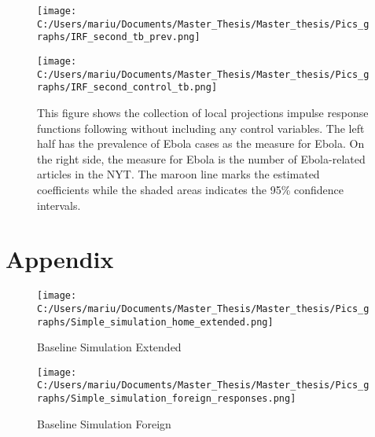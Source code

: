\documentclass{article}
\begin{document}
\begin{figure}[!ht] 
\begin{minipage}[t]{0.5\linewidth}\vspace{0pt} 
\texttt{[image: C:/Users/mariu/Documents/Master\_Thesis/Master\_thesis/Pics\_graphs/IRF\_second\_tb\_prev.png]}\\
\end{minipage}\hfill%
\begin{minipage}[t]{0.5\linewidth}\vspace{0pt} 
\texttt{[image: C:/Users/mariu/Documents/Master\_Thesis/Master\_thesis/Pics\_graphs/IRF\_second\_control\_tb.png]}\\
\end{minipage}\hfill%
\caption{This figure shows the collection of local projections impulse response functions following \cite{jorda2005estimation} without including any control variables. The left half has the prevalence of Ebola cases as the measure for Ebola. On the right side, the measure for Ebola is the number of Ebola-related articles in the NYT. The maroon line marks the estimated coefficients while the shaded areas indicates the 95\% confidence intervals.}
\label{IRF - Trade Balance}
\end{figure}




\pagebreak




\pagebreak
\section{Appendix}

\begin{figure}[!ht]
\begin{center}\caption{Baseline Simulation Extended \label{Baseline Simulation Extended}}
\texttt{[image: C:/Users/mariu/Documents/Master\_Thesis/Master\_thesis/Pics\_graphs/Simple\_simulation\_home\_extended.png]}\\
\end{center}
\end{figure}

\begin{figure}[!ht]
\begin{center}\caption{Baseline Simulation Foreign \label{Baseline Simulation Foreign}}
\texttt{[image: C:/Users/mariu/Documents/Master\_Thesis/Master\_thesis/Pics\_graphs/Simple\_simulation\_foreign\_responses.png]}\\
\end{center}
\end{figure}
\end{document}
